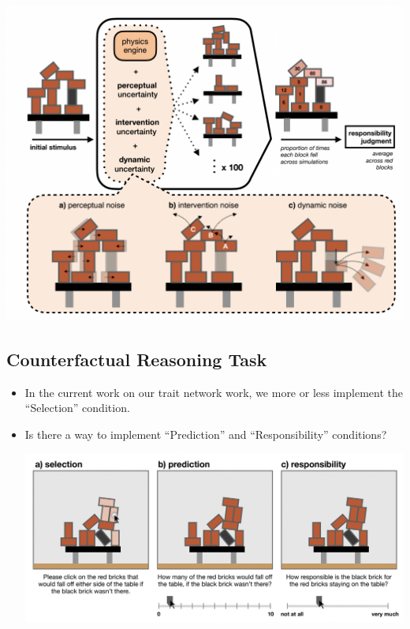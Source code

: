 \documentclass[
  .7em,
  letterpaper,
  DIV=11,
  numbers=noendperiod]{scrartcl}
\begin{document}
\hypertarget{section}{%
\subsection{\texorpdfstring{\protect\includegraphics[width=5.375in,height=\textheight]{images/Screen Shot 2023-01-30 at 4.46.55 PM.png}}{}}\label{section}}

\hypertarget{counterfactual-reasoning-task-1}{%
\subsection{Counterfactual Reasoning
Task}\label{counterfactual-reasoning-task-1}}

\begin{itemize}
\item
  In the current work on our trait network work, we more or less
  implement the ``Selection'' condition.
\item
  Is there a way to implement ``Prediction'' and ``Responsibility''
  conditions?

  \includegraphics{images/Screen Shot 2023-01-30 at 4.48.53 PM.png}
\end{itemize}
\end{document}

